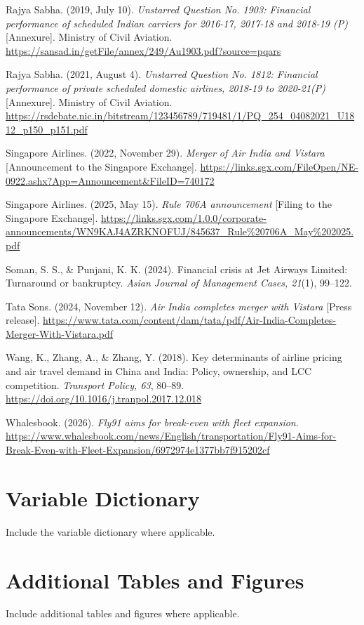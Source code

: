 \documentclass[12pt,a4paper]{article}
\newenvironment{o3box}{\ifthenelse{\boolean{o3highlight}}{\begingroup\color{o3sky}}{}}{\ifthenelse{\boolean{o3highlight}}{\endgroup}{}}
\begin{document}
\begin{o3box}
Rajya Sabha. (2019, July 10). \textit{Unstarred Question No. 1903: Financial performance of scheduled Indian carriers for 2016-17, 2017-18 and 2018-19 (P)} [Annexure]. Ministry of Civil Aviation. \url{https://sansad.in/getFile/annex/249/Au1903.pdf?source=pqars}

Rajya Sabha. (2021, August 4). \textit{Unstarred Question No. 1812: Financial performance of private scheduled domestic airlines, 2018-19 to 2020-21(P)} [Annexure]. Ministry of Civil Aviation. \url{https://rsdebate.nic.in/bitstream/123456789/719481/1/PQ_254_04082021_U1812_p150_p151.pdf}

Singapore Airlines. (2022, November 29). \textit{Merger of Air India and Vistara} [Announcement to the Singapore Exchange]. \url{https://links.sgx.com/FileOpen/NE-0922.ashx?App=Announcement&FileID=740172}

Singapore Airlines. (2025, May 15). \textit{Rule 706A announcement} [Filing to the Singapore Exchange]. \url{https://links.sgx.com/1.0.0/corporate-announcements/WN9KAJ4AZRKNOFUJ/845637_Rule\%20706A_May\%202025.pdf}

Soman, S. S., \& Punjani, K. K. (2024). Financial crisis at Jet Airways Limited: Turnaround or bankruptcy. \textit{Asian Journal of Management Cases, 21}(1), 99--122.

Tata Sons. (2024, November 12). \textit{Air India completes merger with Vistara} [Press release]. \url{https://www.tata.com/content/dam/tata/pdf/Air-India-Completes-Merger-With-Vistara.pdf}


Wang, K., Zhang, A., \& Zhang, Y. (2018). Key determinants of airline pricing and air travel demand in China and India: Policy, ownership, and LCC competition. \textit{Transport Policy, 63}, 80--89. \url{https://doi.org/10.1016/j.tranpol.2017.12.018}

Whalesbook. (2026). \textit{Fly91 aims for break-even with fleet expansion}. \url{https://www.whalesbook.com/news/English/transportation/Fly91-Aims-for-Break-Even-with-Fleet-Expansion/6972974e1377bb7f915202cf}

\endgroup
\end{o3box}


\newpage
\appendix
\section{Variable Dictionary}
Include the variable dictionary where applicable.



\section{Additional Tables and Figures}
Include additional tables and figures where applicable.
\end{document}
